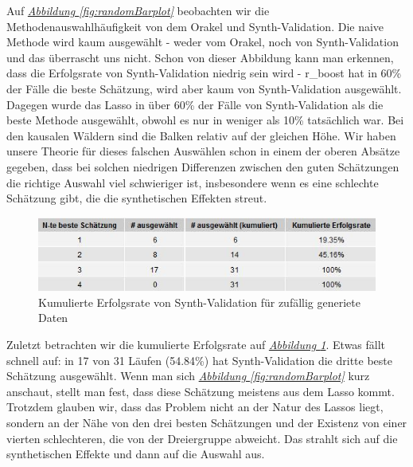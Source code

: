\documentclass[12pt,a4paper,twoside]{scrartcl}
\numberwithin{equation}{section}
\newcommand{\reffig}[1]{\emph{\hyperref[#1]{Abbildung \ref*{#1}}}}
\begin{document}
\noindent
Auf \reffig{fig:randomBarplot} beobachten wir die Methodenauswahlhäufigkeit von dem Orakel und Synth-Validation. Die naive Methode wird kaum ausgewählt - weder vom Orakel, noch von Synth-Validation und das überrascht uns nicht. Schon von dieser Abbildung kann man erkennen, dass die Erfolgsrate von Synth-Validation niedrig sein wird - r\_boost hat in 60\% der Fälle die beste Schätzung, wird aber kaum von Synth-Validation ausgewählt. Dagegen wurde das Lasso in über 60\% der Fälle von Synth-Validation als die beste Methode ausgewählt, obwohl es nur in weniger als 10\% tatsächlich war. Bei den kausalen Wäldern sind die Balken relativ auf der gleichen Höhe. Wir haben unsere Theorie für dieses falschen Auswählen schon in einem der oberen Absätze gegeben, dass bei solchen niedrigen Differenzen zwischen den guten Schätzungen die richtige Auswahl viel schwieriger ist, insbesondere wenn es eine schlechte Schätzung gibt, die die synthetischen Effekten streut.\par   

\begin{center}
\begin{figure}[h]
    \centering
    \includegraphics[height=0.2\textwidth, width=1\textwidth]{figures/plots/randomGrid.jpeg}
    \vspace{1mm}
    \caption[Kumulierte Erfolgsrate von Synth-Validation für zufällig generiete Daten]{Kumulierte Erfolgsrate von Synth-Validation für zufällig generiete Daten}\label{fig:randomGrid}
  \end{figure}
\end{center}

\noindent
Zuletzt betrachten wir die kumulierte Erfolgsrate auf \reffig{fig:randomGrid}. Etwas fällt schnell auf: in 17 von 31 Läufen (54.84\%) hat Synth-Validation die dritte beste Schätzung ausgewählt. Wenn man sich \reffig{fig:randomBarplot} kurz anschaut, stellt man fest, dass diese Schätzung meistens aus dem Lasso kommt. Trotzdem glauben wir, dass das Problem nicht an der Natur des Lassos liegt, sondern an der Nähe von den drei besten Schätzungen und der Existenz von einer vierten schlechteren, die von der Dreiergruppe abweicht. Das strahlt sich auf die synthetischen Effekte und dann auf die Auswahl aus.\par
\end{document}
